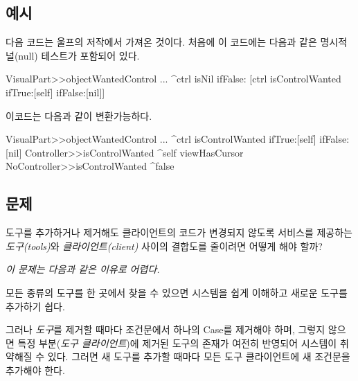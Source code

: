 \documentclass[a4paper,10pt,twoside]{book}
\begin{document}
\subsection*{예시}

다음  코드는 울프\cite{Wool98a}의 저작에서 가져온 것이다. 처음에 이 코드에는 다음과 같은 명시적 널(null) 테스트가 포함되어 있다.

\begin{code}
VisualPart>>objectWantedControl
	...
	^ctrl isNil 
		ifFalse:
			[ctrl isControlWanted
				ifTrue:[self]
				ifFalse:[nil]]
\end{code}

이코드는 다음과 같이 변환가능하다.

\begin{code}
VisualPart>>objectWantedControl
	...
	^ctrl isControlWanted
				ifTrue:[self]
				ifFalse:[nil]
Controller>>isControlWanted
	^self viewHasCursor
NoController>>isControlWanted
	^false
\end{code}





\subsection*{문제}

도구를 추가하거나 제거해도 클라이언트의 코드가 변경되지 않도록 서비스를 제공하는 \emph{도구(tools)}와 \emph{클라이언트(client)} 사이의 결합도를 줄이려면 어떻게 해야 할까?

\emph{이 문제는 다음과 같은 이유로 어렵다.}

\begin{bulletlist}
\item 모든 종류의 도구를 한 곳에서 찾을 수 있으면 시스템을 쉽게 이해하고 새로운 도구를 추가하기 쉽다.

\item 그러나 \emph{도구}를 제거할 때마다 조건문에서 하나의 Case를 제거해야 하며, 그렇지 않으면 특정 부분(\emph{도구 클라이언트})에 제거된 도구의 존재가 여전히 반영되어 시스템이 취약해질 수 있다. 그러면 새 도구를 추가할 때마다 모든 도구 클라이언트에 새 조건문을 추가해야 한다. 
\end{bulletlist}
\end{document}
